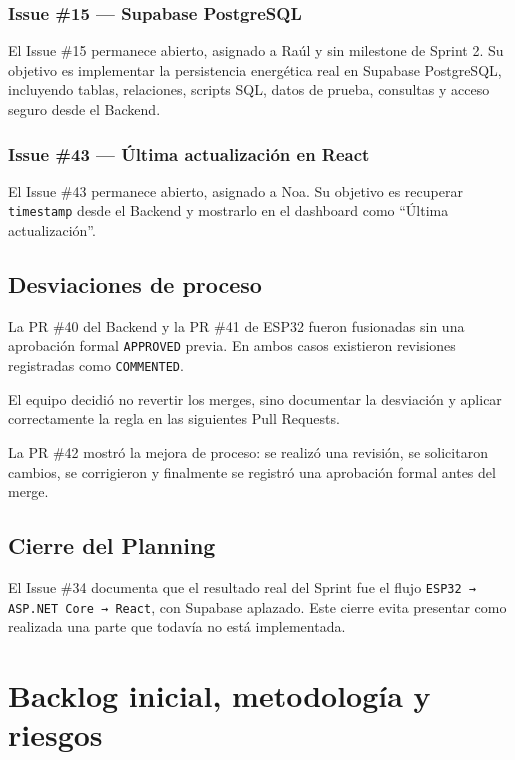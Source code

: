 \documentclass[11pt,a4paper,oneside]{report}
\begin{document}
\subsection{Issue \#15 — Supabase PostgreSQL}

El Issue \#15 permanece abierto, asignado a Raúl y sin milestone de Sprint 2. Su objetivo es implementar la persistencia energética real en Supabase PostgreSQL, incluyendo tablas, relaciones, scripts SQL, datos de prueba, consultas y acceso seguro desde el Backend.

\subsection{Issue \#43 — Última actualización en React}

El Issue \#43 permanece abierto, asignado a Noa. Su objetivo es recuperar \texttt{timestamp} desde el Backend y mostrarlo en el dashboard como ``Última actualización''.

\section{Desviaciones de proceso}

La PR \#40 del Backend y la PR \#41 de ESP32 fueron fusionadas sin una aprobación formal \texttt{APPROVED} previa. En ambos casos existieron revisiones registradas como \texttt{COMMENTED}.

El equipo decidió no revertir los merges, sino documentar la desviación y aplicar correctamente la regla en las siguientes Pull Requests.

La PR \#42 mostró la mejora de proceso: se realizó una revisión, se solicitaron cambios, se corrigieron y finalmente se registró una aprobación formal antes del merge.

\section{Cierre del Planning}

El Issue \#34 documenta que el resultado real del Sprint fue el flujo \texttt{ESP32 → ASP.NET Core → React}, con Supabase aplazado. Este cierre evita presentar como realizada una parte que todavía no está implementada.


\chapter{Backlog inicial, metodología y riesgos}
\end{document}
